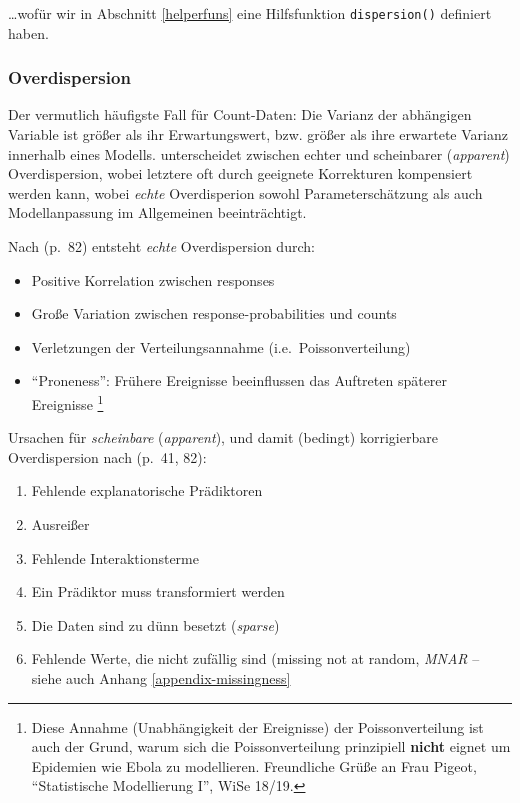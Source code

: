 \documentclass[ngerman,a4paper,]{scrartcl}
\providecommand{\tightlist}{%
  \setlength{\itemsep}{0pt}\setlength{\parskip}{0pt}}
\let\rmarkdownfootnote\footnote%
\def\footnote{\protect\rmarkdownfootnote}
\theoremstyle{definition}
\theoremstyle{definition}
\theoremstyle{definition}
\theoremstyle{remark}
\begin{document}
\ldots{}wofür wir in Abschnitt \ref{helperfuns} eine Hilfsfunktion \texttt{dispersion()} definiert haben.

\hypertarget{overdispersion}{%
\subsubsection{Overdispersion}\label{overdispersion}}

Der vermutlich häufigste Fall für Count-Daten: Die Varianz der abhängigen Variable ist größer als ihr Erwartungswert, bzw. größer als ihre erwartete Varianz innerhalb eines Modells.
\citet{hilbeModelingCountData2014} unterscheidet zwischen echter und scheinbarer (\emph{apparent}) Overdispersion, wobei letztere oft durch geeignete Korrekturen kompensiert werden kann, wobei \emph{echte} Overdisperion sowohl Parameterschätzung als auch Modellanpassung im Allgemeinen beeinträchtigt.

Nach \citet{hilbeModelingCountData2014} (p.~82) entsteht \emph{echte} Overdispersion durch:

\begin{itemize}
\tightlist
\item
  Positive Korrelation zwischen responses
\item
  Große Variation zwischen response-probabilities und counts
\item
  Verletzungen der Verteilungsannahme (i.e.~Poissonverteilung)
\item
  \enquote{Proneness}: Frühere Ereignisse beeinflussen das Auftreten späterer Ereignisse \footnote{Diese Annahme (Unabhängigkeit der Ereignisse) der Poissonverteilung ist auch der Grund, warum sich die Poissonverteilung prinzipiell \textbf{nicht} eignet um Epidemien wie Ebola zu modellieren. Freundliche Grüße an Frau Pigeot, \enquote{Statistische Modellierung I}, WiSe 18/19.}
\end{itemize}

Ursachen für \emph{scheinbare} (\emph{apparent}), und damit (bedingt) korrigierbare Overdispersion nach \citet{hilbeModelingCountData2014} (p.~41, 82):

\begin{enumerate}
\def\labelenumi{\arabic{enumi}.}
\tightlist
\item
  Fehlende explanatorische Prädiktoren
\item
  Ausreißer
\item
  Fehlende Interaktionsterme
\item
  Ein Prädiktor muss transformiert werden
\item
  Die Daten sind zu dünn besetzt (\emph{sparse})
\item
  Fehlende Werte, die nicht zufällig sind (missing not at random, \emph{MNAR} -- siehe auch Anhang \ref{appendix-missingness}
\end{enumerate}
\end{document}
